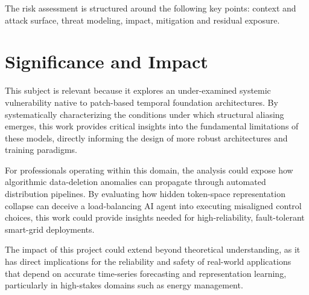 The risk assessment is structured around the following key points: context and attack surface, threat modeling, impact, mitigation and residual exposure.

\section{Significance and Impact} 
This subject is relevant because it explores an under-examined systemic vulnerability native to patch-based temporal foundation architectures.\cite{paganiPreliminaryInsightsChronos2026} By systematically characterizing the conditions under which structural aliasing emerges, this work provides critical insights into the fundamental limitations of these models, directly informing the design of more robust architectures and training paradigms. 

For professionals operating within this domain, the analysis could expose how algorithmic data-deletion anomalies can propagate through automated distribution pipelines. By evaluating how hidden token-space representation collapse can deceive a load-balancing AI agent into executing misaligned control choices, this work could provide insights needed for high-reliability, fault-tolerant smart-grid deployments.

The impact of this project could extend beyond theoretical understanding, as it has direct implications for the reliability and safety of real-world applications that depend on accurate time-series forecasting and representation learning, particularly in high-stakes domains such as energy management.